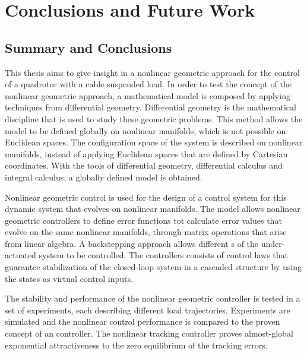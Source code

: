 \chapter{Conclusions and Future Work}\label{ch:conclusion}
\section{Summary and Conclusions}
This thesis aims to give insight in a nonlinear geometric approach for the control of a quadrotor with a cable suspended load. 
In order to test the concept of the nonlinear geometric approach, a mathematical model is composed by applying techniques from differential geometry. 
Differential geometry is the mathematical discipline that is used to study these geometric problems.
This method allows the model to be defined globally on nonlinear manifolds, which is not possible on Euclidean spaces.
The configuration space of the system is described on nonlinear manifolds, instead of applying Euclidean spaces that are defined by Cartesian coordinates.
With the tools of differential geometry, differential calculus and integral calculus, a globally defined model is obtained.

Nonlinear geometric control is used for the design of a control system for this dynamic system that evolves on nonlinear manifolds.
The model allows nonlinear geometric controllers to define error functions tot calculate error values that evolve on the same nonlinear manifolds, 
through matrix operations that arise from linear algebra. 
A backstepping approach allows different s of the under-actuated system to be controlled.
The controllers consists of control laws that guarantee stabilization of the closed-loop system in a cascaded structure by using the states as virtual control inputs. 

The stability and performance of the nonlinear geometric controller is tested in a set of experiments, each describing different load trajectories. 
Experiments are simulated and the nonlinear control performance is compared to the proven concept of an  controller.
The nonlinear tracking controller proves almost-global exponential attractiveness to the zero equilibrium of the tracking errors. 



